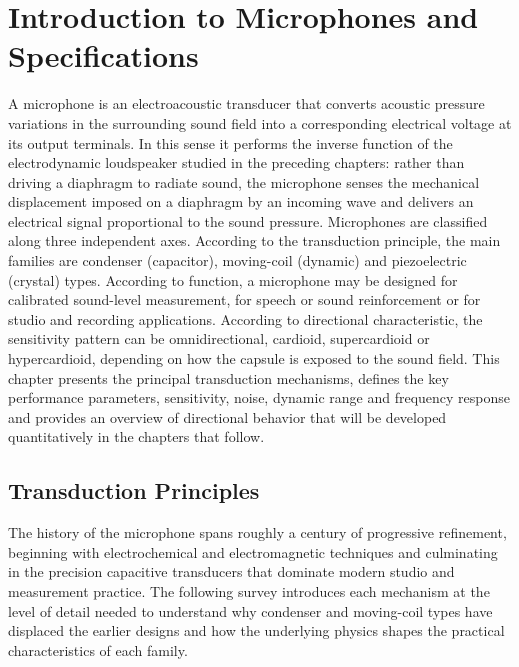 
\graphicspath{{00_Images/11_chapter/}}

\chapter{Introduction to Microphones and Specifications}
\label{ch:microphone_intro}

A microphone is an electroacoustic transducer that converts acoustic pressure variations in the surrounding sound field into a corresponding electrical voltage at its output terminals.
In this sense it performs the inverse function of the electrodynamic loudspeaker studied in the preceding chapters: rather than driving a diaphragm to radiate sound, the microphone senses the mechanical displacement imposed on a diaphragm by an incoming wave and delivers an electrical signal proportional to the sound pressure.
Microphones are classified along three independent axes.
According to the transduction principle, the main families are condenser (capacitor), moving-coil (dynamic) and piezoelectric (crystal) types.
According to function, a microphone may be designed for calibrated sound-level measurement, for speech or sound reinforcement or for studio and recording applications.
According to directional characteristic, the sensitivity pattern can be omnidirectional, cardioid, supercardioid or hypercardioid, depending on how the capsule is exposed to the sound field.
This chapter presents the principal transduction mechanisms, defines the key performance parameters, sensitivity, noise, dynamic range and frequency response and provides an overview of directional behavior that will be developed quantitatively in the chapters that follow.

\section{Transduction Principles}
\label{sc:111}

The history of the microphone spans roughly a century of progressive refinement, beginning with electrochemical and electromagnetic techniques and culminating in the precision capacitive transducers that dominate modern studio and measurement practice.
The following survey introduces each mechanism at the level of detail needed to understand why condenser and moving-coil types have displaced the earlier designs and how the underlying physics shapes the practical characteristics of each family.

